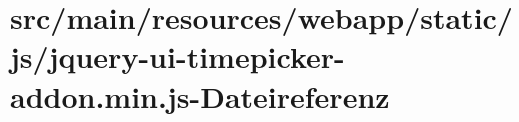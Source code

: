\hypertarget{jquery-ui-timepicker-addon_8min_8js}{\section{src/main/resources/webapp/static/js/jquery-\/ui-\/timepicker-\/addon.min.\+js-\/\+Dateireferenz}
\label{jquery-ui-timepicker-addon_8min_8js}
}

